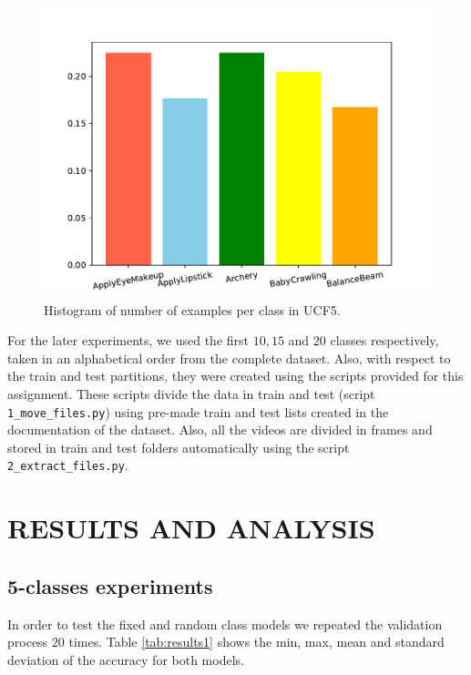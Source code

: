 \documentclass[letterpaper, 10 pt, conference]{ieeeconf}
\begin{document}
\begin{figure}[H]
    \centering
    \includegraphics[scale=0.55]{Figures/histogram_5.pdf}
    \caption{Histogram of number of examples per class in UCF5.}
    \label{fig:hist_5}
\end{figure}

For the later experiments, we used the first \(10,15\) and \(20\) classes respectively, taken in an alphabetical order from the complete dataset. Also, with respect to the train and test partitions, they were created using the scripts provided for this assignment. These scripts divide the data in train and test (script \texttt{1_move_files.py}) using  pre-made train and test lists created in the documentation of the dataset. Also, all the videos are divided in frames and stored in train and test folders automatically using the script \texttt{2_extract_files.py}.

\section{RESULTS AND ANALYSIS}
\label{section:results}
\subsection{5-classes experiments}

In order to test the fixed and random class models we repeated the validation process $20$ times. Table \ref{tab:results1} shows the min, max, mean and standard deviation of the accuracy for both models.
\end{document}

